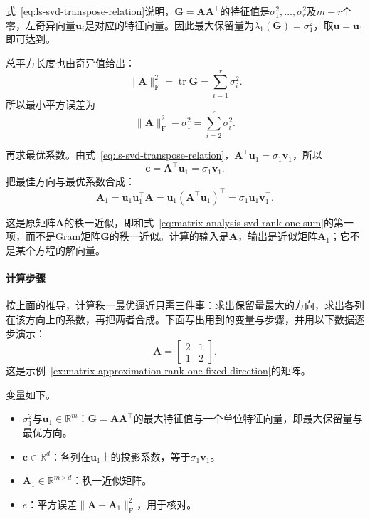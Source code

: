 式~\eqref{eq:ls-svd-transpose-relation}说明，$\bm G=\bm A\bm A^\top$的特征值是$\sigma_1^2,\ldots,\sigma_r^2$及$m-r$个零，左奇异向量$\bm u_i$是对应的特征向量。因此最大保留量为$\lambda_1(\bm G)=\sigma_1^2$，取$\bm u=\bm u_1$即可达到。

总平方长度也由奇异值给出：
\[
 \lVert\bm A\rVert_{\mathrm F}^2=\operatorname{tr}\bm G=\sum_{i=1}^r\sigma_i^2 .
\]
所以最小平方误差为
\begin{equation}
 \lVert\bm A\rVert_{\mathrm F}^2-\sigma_1^2=\sum_{i=2}^r\sigma_i^2 .
 \label{eq:matrix-approximation-rank-one-min-error}
\end{equation}

再求最优系数。由式~\eqref{eq:ls-svd-transpose-relation}，$\bm A^\top\bm u_1=\sigma_1\bm v_1$，所以
\[
 \bm c=\bm A^\top\bm u_1=\sigma_1\bm v_1 .
\]
把最佳方向与最优系数合成：
\begin{equation}
 \bm A_1=\bm u_1\bm u_1^\top\bm A=\bm u_1(\bm A^\top\bm u_1)^\top=\sigma_1\bm u_1\bm v_1^\top .
 \label{eq:matrix-approximation-rank-one-optimum}
\end{equation}

这是原矩阵$\bm A$的秩一近似，即和式~\eqref{eq:matrix-analysis-svd-rank-one-sum}的第一项，而不是Gram矩阵$\bm G$的秩一近似。计算的输入是$\bm A$，输出是近似矩阵$\bm A_1$；它不是某个方程的解向量。

\paragraph{计算步骤}
按上面的推导，计算秩一最优逼近只需三件事：求出保留量最大的方向，求出各列在该方向上的系数，再把两者合成。下面写出用到的变量与步骤，并用以下数据逐步演示：
\[
 \bm A=\begin{bmatrix}2&1\\1&2\end{bmatrix}.
\]
这是示例~\ref{ex:matrix-approximation-rank-one-fixed-direction}的矩阵。

变量如下。
\begin{itemize}
 \item $\sigma_1^2$与$\bm u_1\in\mathbb R^m$：$\bm G=\bm A\bm A^\top$的最大特征值与一个单位特征向量，即最大保留量与最优方向。
 \item $\bm c\in\mathbb R^d$：各列在$\bm u_1$上的投影系数，等于$\sigma_1\bm v_1$。
 \item $\bm A_1\in\mathbb R^{m\times d}$：秩一近似矩阵。
 \item $e$：平方误差$\lVert\bm A-\bm A_1\rVert_{\mathrm F}^2$，用于核对。
\end{itemize}

